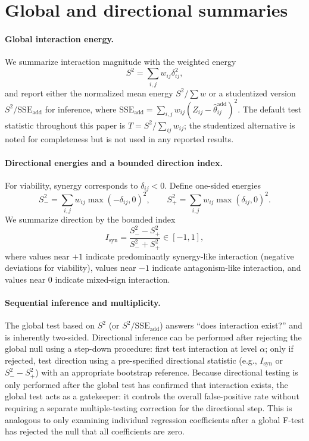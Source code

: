 \documentclass[11pt]{article}
\begin{document}
\section{Global and directional summaries}

\paragraph{Global interaction energy.}
We summarize interaction magnitude with the weighted energy
\begin{equation}
S^2=\sum_{i,j} w_{ij}\delta_{ij}^2,
\end{equation}
and report either the normalized mean energy $S^2/\sum w$ or a studentized version $S^2/\mathrm{SSE}_{\mathrm{add}}$ for inference, where
$\mathrm{SSE}_{\mathrm{add}}=\sum_{i,j} w_{ij}(Z_{ij}-\hat\theta^{\mathrm{add}}_{ij})^2$.
The default test statistic throughout this paper is $T = S^2/\sum_{ij} w_{ij}$; the studentized alternative is noted for completeness but is not used in any reported results.

\paragraph{Directional energies and a bounded direction index.}
For viability, synergy corresponds to $\delta_{ij}<0$.
Define one-sided energies
\begin{equation}
S^2_{-}=\sum_{i,j} w_{ij}\max(-\delta_{ij},0)^2,\qquad
S^2_{+}=\sum_{i,j} w_{ij}\max(\delta_{ij},0)^2.
\end{equation}
We summarize direction by the bounded index
\begin{equation}
I_{\mathrm{syn}}=\frac{S^2_{-}-S^2_{+}}{S^2_{-}+S^2_{+}}\in[-1,1],
\end{equation}
where values near $+1$ indicate predominantly synergy-like interaction (negative deviations for viability), values near $-1$ indicate antagonism-like interaction, and values near $0$ indicate mixed-sign interaction.

\paragraph{Sequential inference and multiplicity.}
The global test based on $S^2$ (or $S^2/\mathrm{SSE}_{\mathrm{add}}$) answers ``does interaction exist?'' and is inherently two-sided.
Directional inference can be performed after rejecting the global null using a step-down procedure: first test interaction at level $\alpha$; only if rejected, test direction using a pre-specified directional statistic (e.g., $I_{\mathrm{syn}}$ or $S^2_{-}-S^2_{+}$) with an appropriate bootstrap reference.
Because directional testing is only performed after the global test has confirmed that interaction exists, the global test acts as a gatekeeper: it controls the overall false-positive rate without requiring a separate multiple-testing correction for the directional step.
This is analogous to only examining individual regression coefficients after a global F-test has rejected the null that all coefficients are zero.
\end{document}
